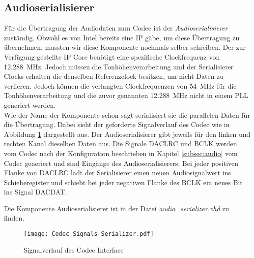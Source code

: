 \newpage
\subsection{Audioserialisierer}\label{subsec:Audio_Serializer}

Für die Übertragung der Audiodaten zum Codec ist der \textit{Audioserialisierer} zuständig. Obwohl es von Intel bereits eine IP gäbe, um diese Übertragung zu übernehmen, mussten wir diese Komponente nochmals selber schreiben. Der zur Verfügung gestellte IP Core benötigt eine spezifische Clockfrequenz von \SI{12.288}{MHz}. Jedoch müssen die Tonhöhenverarbeitung und der Serialisierer Clocks erhalten die denselben Referenzclock besitzen, um nicht Daten zu verlieren. Jedoch können die verlangten Clockfrequenzen von \SI{54}{MHz} für die Tonhöhenverarbeitung und die zuvor genannten \SI{12.288}{MHz} nicht in einem PLL generiert werden. \\
Wie der Name der Komponente schon sagt serialisiert sie die parallelen Daten für die Übertragung. Dabei sieht der geforderte Signalverlauf des Codec wie in Abbildung \ref{img:Codec_Signals} dargestellt aus. Der Audioserialisierer gibt jeweils für den linken und rechten Kanal dieselben Daten aus. Die Signale DACLRC und BCLK werden vom Codec nach der Konfiguration beschrieben in Kapitel \ref{subsec:audio} vom Codec generiert und sind Eingänge des Audioserialisierers. Bei jeder positiven Flanke von DACLRC lädt der Serialisierer einen neuen Audiosignalwert ins Schieberegister und schiebt bei jeder negativen Flanke des BCLK ein neues Bit ins Signal DACDAT.

Die Komponente Audioserialisierer ist in der Datei \textit{audio\_serializer.vhd} zu finden.

\begin{figure}[h!]
	\centering
	\texttt{[image: Codec\_Signals\_Serializer.pdf]}
	\caption{Signalverlauf des Codec Interface} 
	\label{img:Codec_Signals}
\end{figure}  